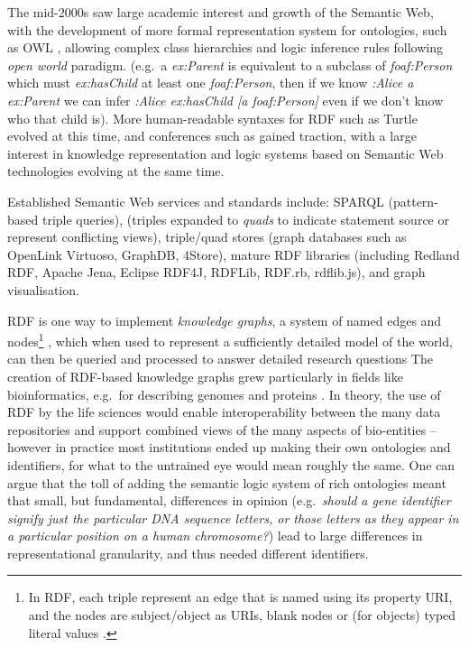 The mid-2000s saw large academic interest and growth of the Semantic Web, with the development of more formal representation system for ontologies, such as OWL \cite{w3-owl2-overview}, allowing complex class hierarchies and logic inference rules following \emph{open world} paradigm. (e.g.~a \emph{ex:Parent} is equivalent to a subclass of \emph{foaf:Person} which must \emph{ex:hasChild} at least one \emph{foaf:Person}, then if we know \emph{:Alice a ex:Parent} we can infer \emph{:Alice ex:hasChild {[}a foaf:Person{]}} even if we don't know who that child is). More human-readable syntaxes for RDF such as Turtle evolved at this time, and conferences such as  \cite{horrocksSemanticWebISWC2002} gained traction, with a large interest in knowledge representation and logic systems based on Semantic Web technologies evolving at the same time.

Established Semantic Web services and standards include: SPARQL \cite{w3-sparql11-overview} (pattern-based triple queries),  \cite{w3-rdf11-concepts} (triples expanded to \emph{quads} to indicate statement source or represent conflicting views), triple/quad stores (graph databases such as OpenLink Virtuoso, GraphDB, 4Store), mature RDF libraries (including Redland RDF, Apache Jena, Eclipse RDF4J, RDFLib, RDF.rb, rdflib.js), and graph visualisation.

RDF is one way to implement \emph{knowledge graphs}, a system of named edges and nodes\footnote{In RDF, each triple represent an edge that is named using its property URI, and the nodes are subject/object as URIs, blank nodes or (for objects) typed literal values \cite{w3-rdf11-primer}.} \cite{nurdiati2008}, which when used to represent a sufficiently detailed model of the world, can then be queried and processed to answer detailed research questions
The creation of RDF-based knowledge graphs grew particularly in fields like bioinformatics, e.g.~for describing genomes and proteins \cite{gobleStateNationData2008c,williamsOpenPHACTSSemantic2012c}. In theory, the use of RDF by the life sciences would enable interoperability between the many data repositories and support combined views of the many aspects of bio-entities -- however in practice most institutions ended up making their own ontologies and identifiers, for what to the untrained eye would mean roughly the same. One can argue that the toll of adding the semantic logic system of rich ontologies meant that small, but fundamental, differences in opinion (e.g.~\emph{should a gene identifier signify just the particular DNA sequence letters, or those letters as they appear in a particular position on a human chromosome?}) lead to large differences in representational granularity, and thus needed different identifiers.

